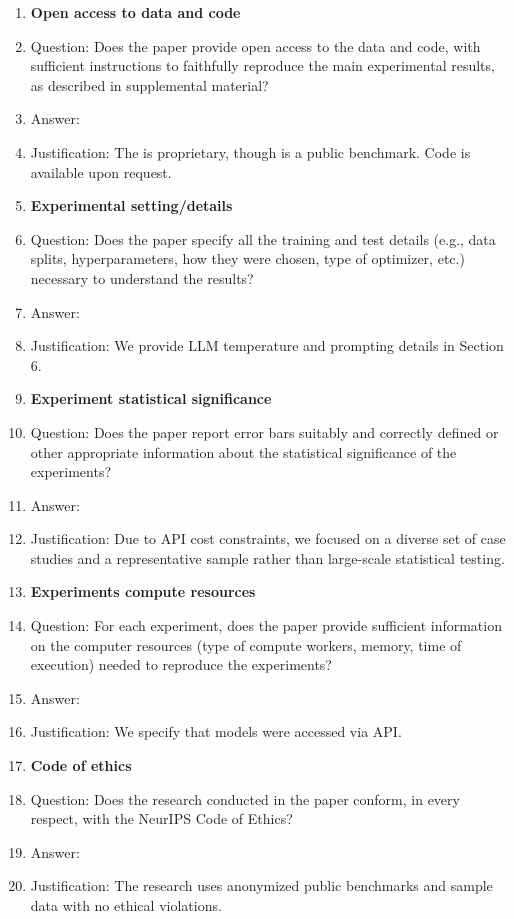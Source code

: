 \documentclass{article}
\begin{document}
\begin{enumerate}
\item {\bf Open access to data and code}
    \item[] Question: Does the paper provide open access to the data and code, with sufficient instructions to faithfully reproduce the main experimental results, as described in supplemental material?
    \item[] Answer: \answerNo{}
    \item[] Justification: The \spotifydata is proprietary, though \musicrs is a public benchmark. Code is available upon request.

\item {\bf Experimental setting/details}
    \item[] Question: Does the paper specify all the training and test details (e.g., data splits, hyperparameters, how they were chosen, type of optimizer, etc.) necessary to understand the results?
    \item[] Answer: \answerYes{}
    \item[] Justification: We provide LLM temperature and prompting details in Section 6.

\item {\bf Experiment statistical significance}
    \item[] Question: Does the paper report error bars suitably and correctly defined or other appropriate information about the statistical significance of the experiments?
    \item[] Answer: \answerNo{}
    \item[] Justification: Due to API cost constraints, we focused on a diverse set of case studies and a representative sample rather than large-scale statistical testing.

\item {\bf Experiments compute resources}
    \item[] Question: For each experiment, does the paper provide sufficient information on the computer resources (type of compute workers, memory, time of execution) needed to reproduce the experiments?
    \item[] Answer: \answerYes{}
    \item[] Justification: We specify that models were accessed via API.

\item {\bf Code of ethics}
    \item[] Question: Does the research conducted in the paper conform, in every respect, with the NeurIPS Code of Ethics?
    \item[] Answer: \answerYes{}
    \item[] Justification: The research uses anonymized public benchmarks and sample data with no ethical violations.


\end{enumerate}
\end{document}
